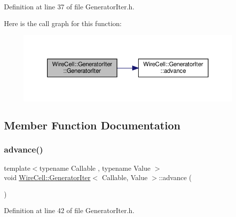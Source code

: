 Definition at line 37 of file Generator\+Iter.\+h.

Here is the call graph for this function\+:
\nopagebreak
\begin{figure}[H]
\begin{center}
\leavevmode
\includegraphics[width=350pt]{struct_wire_cell_1_1_generator_iter_af83b73da6292cce8ab5548afefa69bb7_cgraph}
\end{center}
\end{figure}


\subsection{Member Function Documentation}
\mbox{\label{struct_wire_cell_1_1_generator_iter_a3b5e2a57fd913539527a00a2600f32b0}} 
\subsubsection{\texorpdfstring{advance()}{advance()}}
{\footnotesize\ttfamily template$<$typename Callable , typename Value $>$ \\
void \hyperlink{struct_wire_cell_1_1_generator_iter}{Wire\+Cell\+::\+Generator\+Iter}$<$ Callable, Value $>$\+::advance (\begin{DoxyParamCaption}{ }\end{DoxyParamCaption})\hspace{0.3cm}{\ttfamily [inline]}}



Definition at line 42 of file Generator\+Iter.\+h.


